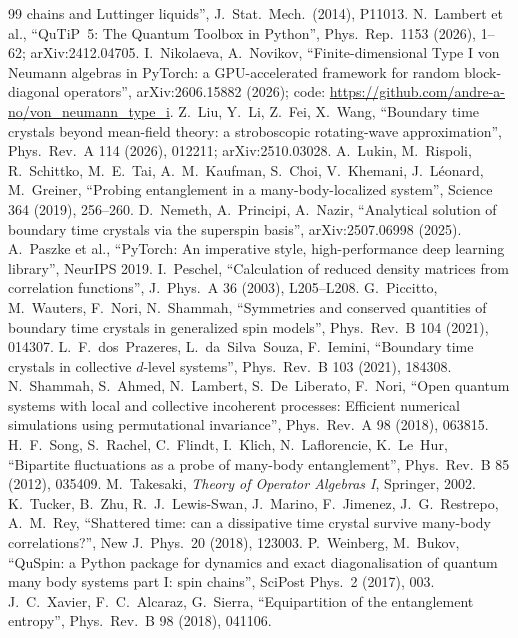 \documentclass[11pt]{article}
\begin{document}
{\begin{thebibliography}{99}
  chains and Luttinger liquids'', J.\ Stat.\ Mech.\ (2014), P11013.
 N.~Lambert et al., ``QuTiP~5: The Quantum Toolbox in Python'', Phys.\ Rep.\ 1153 (2026),
  1--62; arXiv:2412.04705.
 I.~Nikolaeva, A.~Novikov, ``Finite-dimensional Type I von Neumann algebras in PyTorch: a
  GPU-accelerated framework for random block-diagonal operators'', arXiv:2606.15882 (2026);
  code: \url{https://github.com/andre-a-no/von_neumann_type_i}.
 Z.~Liu, Y.~Li, Z.~Fei, X.~Wang, ``Boundary time crystals beyond mean-field theory: a stroboscopic
  rotating-wave approximation'', Phys.\ Rev.\ A 114 (2026), 012211; arXiv:2510.03028.
 A.~Lukin, M.~Rispoli, R.~Schittko, M.~E.~Tai, A.~M.~Kaufman, S.~Choi, V.~Khemani, J.~L\'eonard,
  M.~Greiner, ``Probing entanglement in a many-body-localized system'', Science 364 (2019), 256--260.
 D.~Nemeth, A.~Principi, A.~Nazir, ``Analytical solution of boundary time crystals via the
  superspin basis'', arXiv:2507.06998 (2025).
 A.~Paszke et al., ``PyTorch: An imperative style, high-performance deep learning
  library'', NeurIPS 2019.
 I.~Peschel, ``Calculation of reduced density matrices from correlation functions'',
  J.\ Phys.\ A 36 (2003), L205--L208.
 G.~Piccitto, M.~Wauters, F.~Nori, N.~Shammah, ``Symmetries and conserved quantities of
  boundary time crystals in generalized spin models'', Phys.\ Rev.\ B 104 (2021), 014307.
 L.~F.~dos~Prazeres, L.~da~Silva~Souza, F.~Iemini, ``Boundary time crystals in collective
  $d$-level systems'', Phys.\ Rev.\ B 103 (2021), 184308.
 N.~Shammah, S.~Ahmed, N.~Lambert, S.~De~Liberato, F.~Nori, ``Open quantum systems with local
  and collective incoherent processes: Efficient numerical simulations using permutational invariance'',
  Phys.\ Rev.\ A 98 (2018), 063815.
 H.~F.~Song, S.~Rachel, C.~Flindt, I.~Klich, N.~Laflorencie, K.~Le~Hur, ``Bipartite fluctuations as
  a probe of many-body entanglement'', Phys.\ Rev.\ B 85 (2012), 035409.
 M.~Takesaki, \emph{Theory of Operator Algebras I}, Springer, 2002.
 K.~Tucker, B.~Zhu, R.~J.~Lewis-Swan, J.~Marino, F.~Jimenez, J.~G.~Restrepo, A.~M.~Rey,
  ``Shattered time: can a dissipative time crystal survive many-body correlations?'', New J.\ Phys.\ 20 (2018),
  123003.
 P.~Weinberg, M.~Bukov, ``QuSpin: a Python package for dynamics and exact diagonalisation of
  quantum many body systems part I: spin chains'', SciPost Phys.\ 2 (2017), 003.
 J.~C.~Xavier, F.~C.~Alcaraz, G.~Sierra, ``Equipartition of the entanglement entropy'',
  Phys.\ Rev.\ B 98 (2018), 041106.
\end{thebibliography}
}
\end{document}
